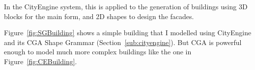 In the CityEngine \cite{Muller2006} system, this is applied to the generation of buildings using 3D blocks for the main form, and 2D shapes to design the facades.


Figure~\ref{fig:SGBuilding} shows a simple building that I modelled using CityEngine and its CGA Shape Grammar (Section~\ref{sub:cityengine}). But CGA is powerful enough to model much more complex buildings like the one in Figure~\ref{fig:CEBuilding}.



